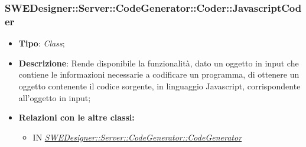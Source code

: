 \documentclass[../SpecificaTecnica.tex]{subfiles}
\begin{document}
			\subsubsection{SWEDesigner::Server::CodeGenerator::Coder::JavascriptCoder}
			\hypertarget{SWEDesigner::Server::CodeGenerator::Coder::JavascriptCoder}{}
			\begin{itemize}
				\item \textbf{Tipo}: \emph{Class};
				\item \textbf{Descrizione}: Rende disponibile la funzionalità, dato un oggetto in input che contiene le informazioni necessarie a codificare un programma, di ottenere un oggetto contenente il codice sorgente, in linguaggio Javascript, corrispondente all'oggetto in input;
				\item \textbf{Relazioni con le altre classi:}
				\begin{itemize}
					\item IN \hyperlink{SWEDesigner::Server::CodeGenerator::CodeGenerator}{\emph{SWEDesigner::Server::CodeGenerator::CodeGenerator}}
				\end{itemize}	
			\end{itemize}
			
			
			
\end{document}
